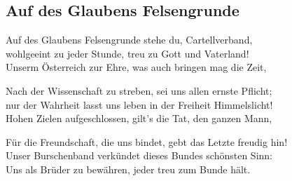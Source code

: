 
\subsection*{Auf des Glaubens Felsengrunde}

\thestrophe Auf des Glaubens Felsengrunde stehe du, Cartellverband, \\
wohlgeeint zu jeder Stunde, treu zu Gott und Vaterland! \\
Unserm Österreich zur Ehre, was auch bringen mag die Zeit, \\

\thestrophe Nach der Wissenschaft zu streben, sei uns allen ernste Pflicht; \\
nur der Wahrheit lasst uns leben in der Freiheit Himmelslicht! \\
Hohen Zielen aufgeschlossen, gilt's die Tat, den ganzen Mann, \\

\thestrophe Für die Freundschaft, die uns bindet, gebt das Letzte freudig hin! \\
Unser Burschenband verkündet dieses Bundes schönsten Sinn: \\
Uns als Brüder zu bewähren, jeder treu zum Bunde hält.\\
